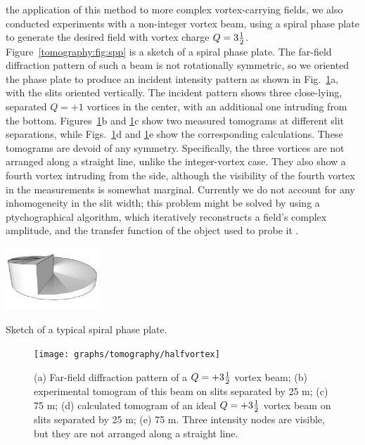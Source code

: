  the application of this method to more complex vor\-tex-car\-ry\-ing fields, we also conducted experiments with a non-integer vortex beam, using a spiral phase plate \cite{Oemrawsingh2004b} to generate the desired field with vortex charge $Q=3\mbox{$\frac{1}{2}$}$.
Figure~\ref{tomography:fig:spp} is a sketch of a spiral phase plate.
The far-field diffraction pattern of such a beam is not rotationally symmetric, so we oriented the phase plate to produce an incident intensity pattern as shown in Fig.~\ref{fig5}a, with the slits oriented vertically. The incident pattern shows three close-lying, separated $Q = +1$ vortices in the center, with an additional one intruding from the bottom.
Figures~\ref{fig5}b and \ref{fig5}c show two measured tomograms at different slit separations, while Figs.~\ref{fig5}d and \ref{fig5}e show the corresponding calculations.
These tomograms are devoid of any symmetry.
Specifically, the three vortices are not arranged along a straight line, unlike the integer-vortex case.
They also show a fourth vortex intruding from the side, although the visibility of the fourth vortex in the measurements is somewhat marginal.
Currently we do not account for any inhomogeneity in the slit width; this problem might be solved by using a ptychographical algorithm, which iteratively reconstructs a field's complex amplitude, and the transfer function of the object used to probe it \cite{Maiden2009}.
%
\begin{marginfigure}
\centering
\includegraphics[width=1.37in]{illustrations/tomography/spp} %
\caption{Sketch of a typical spiral phase plate.}
\label{tomography:fig:spp}
\end{marginfigure}
%
\begin{figure}[tb]
\forceversofloat\centering
\texttt{[image: graphs/tomography/halfvortex]}
\caption{(a) Far-field diffraction pattern of a $Q = +3\mbox{$\frac{1}{2}$}$ vortex beam; (b) experimental tomogram of this beam on slits separated by 25 \textmu m; (c) 75 \textmu m; (d) calculated tomogram of an ideal $Q=+3\mbox{$\frac{1}{2}$}$ vortex beam on slits separated by 25 \textmu m; (e) 75 \textmu m.
Three intensity nodes are visible, but they are not arranged along a straight line.}
\label{fig5}
\end{figure}

